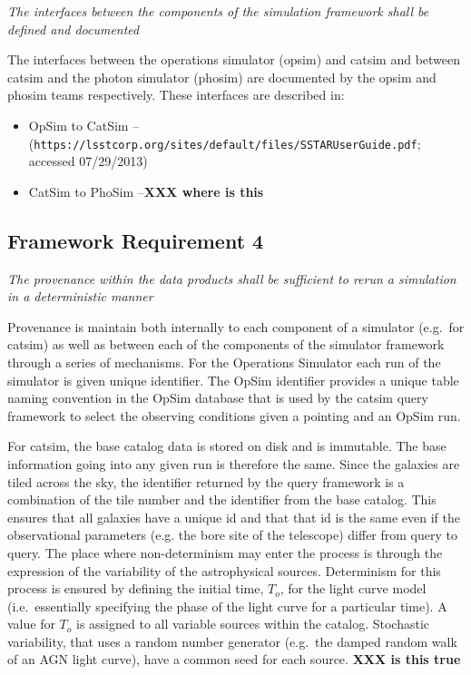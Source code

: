 \documentclass[]{article}
\begin{document}
{{\it  The interfaces between the components of the simulation framework shall be defined 
and documented}

The interfaces between the operations simulator (opsim) and catsim and
between catsim and the photon simulator (phosim) are documented by the
opsim and phosim teams respectively.  These interfaces are described in:
\begin{itemize}
\item OpSim to CatSim -- ({\tt https://lsstcorp.org/sites/default/files/SSTARUserGuide.pdf}; accessed 07/29/2013)
\item CatSim to PhoSim --{\bf XXX where is this}
\end{itemize}

\subsection{Framework Requirement 4} 

{\it The provenance within the data products shall be sufficient to rerun a simulation in a 
deterministic manner}

Provenance is maintain both internally to each component of a
simulator (e.g.\ for catsim) as well as between each of the components
of the simulator framework through a series of mechanisms. For the
Operations Simulator each run of the simulator is given unique
identifier.  The OpSim identifier provides a unique table naming
convention in the OpSim database that is used by the catsim query
framework to select the observing conditions given a pointing and an
OpSim run. 

For catsim, the base catalog data is stored on disk and is
immutable. The base information going into any given run is therefore
the same.  Since the galaxies are tiled across the sky, the identifier
returned by the query framework is a combination of the tile number
and the identifier from the base catalog. This ensures that all
galaxies have a unique id and that that id is the same even if the
observational parameters (e.g. the bore site of the telescope) differ
from query to query.  The place where non-determinism may enter the
process is through the expression of the variability of the
astrophysical sources. Determinism for this process is ensured by
defining the initial time, $T_o$, for the light curve model (i.e.\
essentially specifying the phase of the light curve for a particular
time). A value for $T_o$ is assigned to all variable sources within
the catalog.  Stochastic variability, that uses a random number
generator (e.g.\ the damped random walk of an AGN light curve), have a
common seed for each source.
{\bf XXX is this true}

}
\end{document}
